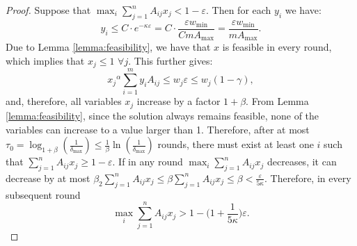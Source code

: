 \documentclass[11pt]{article}
\begin{document}
\begin{proof}
Suppose that $\max_i \sum_{j=1}^n A_{ij}x_j < 1- \varepsilon$. Then for each $y_i$ we have:
\begin{equation*}
y_i\leq C\cdot e^{-\kappa\varepsilon}=C\cdot\frac{\varepsilon  w_{\min}}{CmA_{\max}}=\frac{\varepsilon  w_{\min}}{m{A_{\max}}}.
\end{equation*}
Due to Lemma \ref{lemma:feasibility}, we have that $x$ is feasible in every round, which implies that $x_j\leq 1$ $\forall j$. This further gives:
\begin{equation*}
{x_j}^{\alpha}\sum_{i=1}^m y_iA_{ij}\leq w_j\varepsilon \leq w_j(1-\gamma),
\end{equation*}
and, therefore, all variables $x_j$ increase by a factor $1+\beta$. From Lemma \ref{lemma:feasibility}, since the solution always remains feasible, none of the variables can increase to a value larger than 1. Therefore, after at most $\tau_0=\log_{1+\beta}\left(\frac{1}{\delta_{\max}}\right) \leq \frac{1}{\beta}\ln\left(\frac{1}{\delta_{\max}}\right)$ rounds, there must exist at least one $i$ such that $\sum_{j=1}^n A_{ij}x_j\geq 1-\varepsilon$. If in any round $\max_{i}\sum_{j=1}^n A_{ij}x_j$ decreases, it can decrease by at most $\beta_2\sum_{j=1}^n A_{ij}x_j\leq\beta\sum_{j=1}^n A_{ij}x_j\leq\beta<\frac{\varepsilon}{5\kappa}$. Therefore, in every subsequent round 
\begin{equation*}\max_{i}\sum_{j=1}^n A_{ij}x_j>1-\Big(1+\frac{1}{5\kappa}\Big)\varepsilon.
\end{equation*}


\end{proof}
\end{document}
